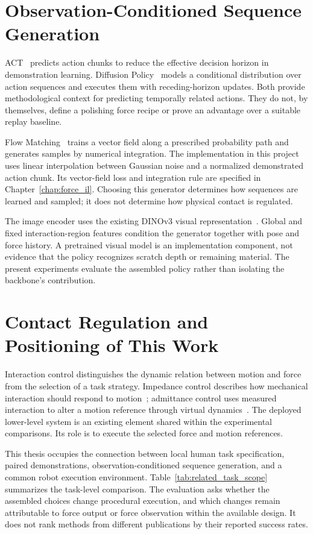 \section{Observation-Conditioned Sequence Generation}
ACT~\cite{zhao2023act} predicts action chunks to reduce the effective decision horizon in demonstration learning. Diffusion Policy~\cite{chi2023diffusionpolicy} models a conditional distribution over action sequences and executes them with receding-horizon updates. Both provide methodological context for predicting temporally related actions. They do not, by themselves, define a polishing force recipe or prove an advantage over a suitable replay baseline.

Flow Matching~\cite{lipman2023flow} trains a vector field along a prescribed probability path and generates samples by numerical integration. The implementation in this project uses linear interpolation between Gaussian noise and a normalized demonstrated action chunk. Its vector-field loss and integration rule are specified in Chapter~\ref{chap:force_il}. Choosing this generator determines how sequences are learned and sampled; it does not determine how physical contact is regulated.

The image encoder uses the existing DINOv3 visual representation~\cite{simeoni2025dinov3}. Global and fixed interaction-region features condition the generator together with pose and force history. A pretrained visual model is an implementation component, not evidence that the policy recognizes scratch depth or remaining material. The present experiments evaluate the assembled policy rather than isolating the backbone's contribution.

\section{Contact Regulation and Positioning of This Work}
Interaction control distinguishes the dynamic relation between motion and force from the selection of a task strategy. Impedance control describes how mechanical interaction should respond to motion~\cite{hogan1985impedance}; admittance control uses measured interaction to alter a motion reference through virtual dynamics~\cite{keemink2018admittance}. The deployed lower-level system is an existing element shared within the experimental comparisons. Its role is to execute the selected force and motion references.

This thesis occupies the connection between local human task specification, paired demonstrations, observation-conditioned sequence generation, and a common robot execution environment. Table~\ref{tab:related_task_scope} summarizes the task-level comparison. The evaluation asks whether the assembled choices change procedural execution, and which changes remain attributable to force output or force observation within the available design. It does not rank methods from different publications by their reported success rates.

